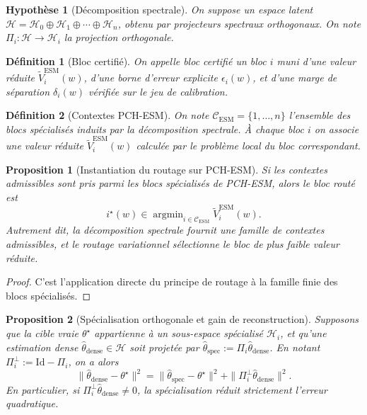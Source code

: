 \documentclass[11pt,a4paper]{article}
\newtheorem{definition}{Définition}[section]
\newtheorem{assumption}{Hypothèse}[section]
\newtheorem{proposition}{Proposition}[section]
\DeclareMathOperator{\argmin}{argmin}
\newcommand{\Hh}{\mathcal H}
\newcommand{\Ccal}{\mathcal C}
\begin{document}
\begin{assumption}[Décomposition spectrale]
On suppose un espace latent \(\Hh=\Hh_0\oplus \Hh_1\oplus\cdots\oplus \Hh_n\), obtenu par projecteurs spectraux orthogonaux. On note \(\Pi_i:\Hh\to\Hh_i\) la projection orthogonale.
\end{assumption}

\begin{definition}[Bloc certifié]
On appelle bloc certifié un bloc \(i\) muni d'une valeur réduite \(\widetilde V_i^{\mathrm{ESM}}(w)\), d'une borne d'erreur explicite \(\epsilon_i(w)\), et d'une marge de séparation \(\delta_i(w)\) vérifiée sur le jeu de calibration.
\end{definition}

\begin{definition}[Contextes PCH-ESM]
On note \(\Ccal_{\mathrm{ESM}}=\{1,\dots,n\}\) l'ensemble des blocs spécialisés induits par la décomposition spectrale. À chaque bloc \(i\) on associe une valeur réduite \(\widetilde V_i^{\mathrm{ESM}}(w)\) calculée par le problème local du bloc correspondant.
\end{definition}

\begin{proposition}[Instantiation du routage sur PCH-ESM]
Si les contextes admissibles sont pris parmi les blocs spécialisés de PCH-ESM, alors le bloc routé est
\[
i^\star(w)\in\argmin_{i\in\Ccal_{\mathrm{ESM}}}\widetilde V_i^{\mathrm{ESM}}(w).
\]
Autrement dit, la décomposition spectrale fournit une famille de contextes admissibles, et le routage variationnel sélectionne le bloc de plus faible valeur réduite.
\end{proposition}

\begin{proof}
C'est l'application directe du principe de routage à la famille finie des blocs spécialisés.
\end{proof}

\begin{proposition}[Spécialisation orthogonale et gain de reconstruction]
Supposons que la cible vraie \(\theta^\star\) appartienne à un sous-espace spécialisé \(\Hh_i\), et qu'une estimation dense \(\hat\theta_{\mathrm{dense}}\in\Hh\) soit projetée par \(\hat\theta_{\mathrm{spec}}:=\Pi_i\hat\theta_{\mathrm{dense}}\). En notant \(\Pi_i^\perp:=\mathrm{Id}-\Pi_i\), on a alors
\[
\|\hat\theta_{\mathrm{dense}}-\theta^\star\|^2
=
\|\hat\theta_{\mathrm{spec}}-\theta^\star\|^2
+
\|\Pi_i^\perp \hat\theta_{\mathrm{dense}}\|^2.
\]
En particulier, si \(\Pi_i^\perp \hat\theta_{\mathrm{dense}}\neq 0\), la spécialisation réduit strictement l'erreur quadratique.
\end{proposition}
\end{document}
